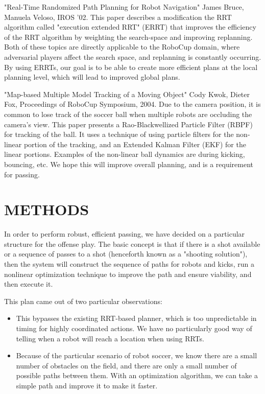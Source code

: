 \documentclass[a4paper, 10pt, conference]{ieeeconf}      %
\begin{document}
"Real-Time Randomized Path Planning for Robot Navigation" James Bruce, Manuela Veloso, IROS '02. This paper describes a modification the RRT algorithm called "execution extended RRT" (ERRT) that improves the efficiency of the RRT algorithm by weighting the search-space and improving replanning. Both of these topics are directly applicable to the RoboCup domain, where adversarial players affect the search space, and replanning is constantly occurring. By using ERRTs, our goal is to be able to create more efficient plans at the local planning level, which will lead to improved global plans.

"Map-based Multiple Model Tracking of a Moving Object" Cody Kwok, Dieter Fox, Proceedings of RoboCup Symposium, 2004. Due to the camera position, it is common to lose track of the soccer ball when multiple robots are occluding the camera's view. This paper presents a Rao-Blackwellized Particle Filter (RBPF) for tracking of the ball. It uses a technique of using particle filters for the non-linear portion of the tracking, and an Extended Kalman Filter (EKF) for the linear portions. Examples of the non-linear ball dynamics are during kicking, bouncing, etc. We hope this will improve overall planning, and is a requirement for passing.

\section{METHODS}
In order to perform robust, efficient passing, we have decided on a particular structure for the offense play. The basic concept is that if there is a shot available or a sequence of passes to a shot (henceforth known as a "shooting solution"), then the system will construct the sequence of paths for robots and kicks, run a nonlinear optimization technique to improve the path and ensure viability, and then execute it.

This plan came out of two particular observations:

\begin{itemize}
 \item This bypasses the existing RRT-based planner, which is too unpredictable in timing for highly coordinated actions. We have no particularly good way of telling when a robot will reach a location when using RRTs.
 \item Because of the particular scenario of robot soccer, we know there are a small number of obstacles on the field, and there are only a small number of possible paths between them. With an optimization algorithm, we can take a simple path and improve it to make it faster.
\end{itemize}
\end{document}
